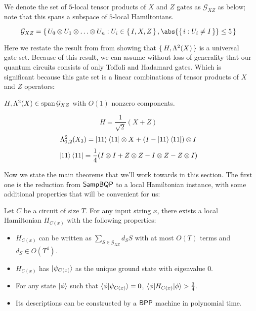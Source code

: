 

We denote the set of $5$-local tensor products of $X$ and $Z$ gates as $\mathcal{G}_{XZ}$ as below; note that this spans a subspace of $5$-local Hamiltonians.
\begin{dfn}
	$$\mathcal{G}_{XZ}=\set{U_0\otimes U_1\otimes\ldots\otimes U_n: U_i\in\set{I,X,Z}, \abs{\set{i: U_i\ne I}}\leq 5}$$
\end{dfn}


Here we restate the result from from \cite{quant-ph/0301040} showing that $\set{H, \Lambda^2(X)}$ is a universal gate set.
Because of this result, we can assume without loss of generality that our quantum circuits consists of only Toffoli and Hadamard gates.
Which is significant because this gate set is a linear combinations of tensor products of $X$ and $Z$ operators:
\begin{thm}
	$H,\Lambda^2(X)\in\operatorname*{\operatorname{span}}\mathcal{G}_{XZ}$ with $O(1)$ nonzero components.
\end{thm}
\begin{prf}
	$$H=\frac{1}{\sqrt{2}}(X+Z)$$
	$$\Lambda^2_{1,2}(X_3)=\ket{11}\bra{11}\otimes X+(I-\ket{11}\bra{11})\otimes I$$
	$$\ket{11}\bra{11}=\frac{1}{4}(I\otimes I+Z\otimes Z-I\otimes Z-Z\otimes I)$$
\end{prf}





Now we state the main theorems that we'll work towards in this section.
The first one is the reduction from $\operatorname{\mathsf{SampBQP}}$ to a local Hamiltonian instance, with some additional properties that will be convenient for us:
\begin{thm}
	\label{thm:LHReduction}
	Let $C$ be a circuit of size $T$. For any input string $x$, there exists a local Hamiltonian $H_{C(x)}$  with the following properties:
	\begin{itemize}
		\item $H_{C(x)}$ can be written as $\sum_{S\in\mathcal{G}_{XZ}} d_S S$ with at most $O(T)$ terms and $d_S\in O(T^4)$.
		\item $H_{C(x)}$ has $\ket{\psi_{C(x)}}$ as the unique ground state with eigenvalue $0$.
		\item For any state $\ket\phi$ such that $\braket{\phi|\psi_{C(x)}}=0$,  $\braket{\phi|H_{C(x)}|\phi}>\frac{3}{4}$.
		\item Its descriptions can be constructed by a $\operatorname{\mathsf{BPP}}$ machine in polynomial time.
	\end{itemize}
\end{thm}

